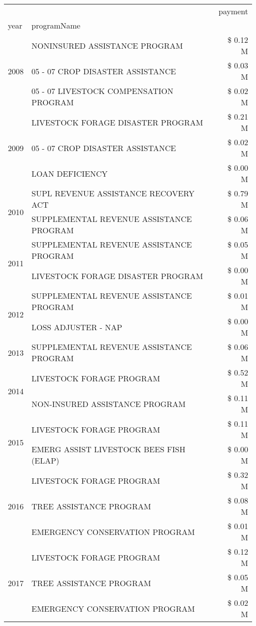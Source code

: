 \begin{tabular}{llr}
\toprule
 &  & payment \\
year & programName &  \\
\midrule
\multirow[t]{3}{*}{2008} & NONINSURED ASSISTANCE PROGRAM & \$ 0.12 M \\
 & 05 - 07 CROP DISASTER ASSISTANCE & \$ 0.03 M \\
 & 05 - 07 LIVESTOCK COMPENSATION PROGRAM & \$ 0.02 M \\
\cline{1-3}
\multirow[t]{3}{*}{2009} & LIVESTOCK FORAGE DISASTER  PROGRAM & \$ 0.21 M \\
 & 05 - 07 CROP DISASTER ASSISTANCE & \$ 0.02 M \\
 & LOAN DEFICIENCY & \$ 0.00 M \\
\cline{1-3}
\multirow[t]{2}{*}{2010} & SUPL REVENUE ASSISTANCE RECOVERY ACT & \$ 0.79 M \\
 & SUPPLEMENTAL REVENUE ASSISTANCE PROGRAM & \$ 0.06 M \\
\cline{1-3}
\multirow[t]{2}{*}{2011} & SUPPLEMENTAL REVENUE ASSISTANCE PROGRAM & \$ 0.05 M \\
 & LIVESTOCK FORAGE DISASTER PROGRAM & \$ 0.00 M \\
\cline{1-3}
\multirow[t]{2}{*}{2012} & SUPPLEMENTAL REVENUE ASSISTANCE PROGRAM & \$ 0.01 M \\
 & LOSS ADJUSTER - NAP & \$ 0.00 M \\
\cline{1-3}
2013 & SUPPLEMENTAL REVENUE ASSISTANCE PROGRAM & \$ 0.06 M \\
\cline{1-3}
\multirow[t]{2}{*}{2014} & LIVESTOCK FORAGE PROGRAM & \$ 0.52 M \\
 & NON-INSURED ASSISTANCE PROGRAM & \$ 0.11 M \\
\cline{1-3}
\multirow[t]{2}{*}{2015} & LIVESTOCK FORAGE PROGRAM & \$ 0.11 M \\
 & EMERG ASSIST LIVESTOCK BEES FISH (ELAP) & \$ 0.00 M \\
\cline{1-3}
\multirow[t]{3}{*}{2016} & LIVESTOCK FORAGE PROGRAM                      & \$ 0.32 M \\
 & TREE ASSISTANCE PROGRAM                       & \$ 0.08 M \\
 & EMERGENCY CONSERVATION PROGRAM                & \$ 0.01 M \\
\cline{1-3}
\multirow[t]{3}{*}{2017} & LIVESTOCK FORAGE PROGRAM & \$ 0.12 M \\
 & TREE ASSISTANCE PROGRAM & \$ 0.05 M \\
 & EMERGENCY CONSERVATION PROGRAM & \$ 0.02 M \\

\end{tabular}
